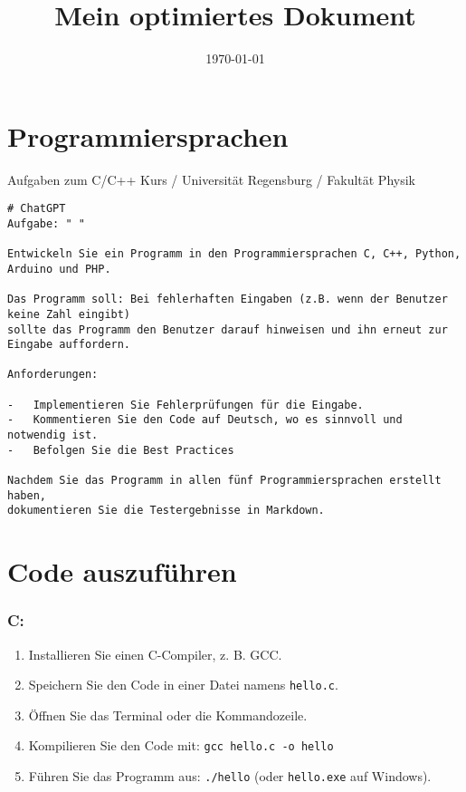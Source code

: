 \documentclass[12pt,a4paper]{scrartcl}
\title{Mein optimiertes Dokument}
\date{\today}
\newcommand{\tightlist}{
  \setlength{\itemsep}{0pt}\setlength{\parskip}{0pt}
}
\begin{document}
\maketitle

\hypertarget{programmiersprachen}{%
\section{Programmiersprachen}\label{programmiersprachen}}

Aufgaben zum C/C++ Kurs / Universität Regensburg / Fakultät Physik

\begin{lstlisting}
# ChatGPT
Aufgabe: " "

Entwickeln Sie ein Programm in den Programmiersprachen C, C++, Python, Arduino und PHP. 

Das Programm soll: Bei fehlerhaften Eingaben (z.B. wenn der Benutzer keine Zahl eingibt) 
sollte das Programm den Benutzer darauf hinweisen und ihn erneut zur Eingabe auffordern.

Anforderungen:

-   Implementieren Sie Fehlerprüfungen für die Eingabe.
-   Kommentieren Sie den Code auf Deutsch, wo es sinnvoll und notwendig ist.
-   Befolgen Sie die Best Practices

Nachdem Sie das Programm in allen fünf Programmiersprachen erstellt haben, 
dokumentieren Sie die Testergebnisse in Markdown.
\end{lstlisting}

\hypertarget{code-auszufuxfchren}{%
\section{Code auszuführen}\label{code-auszufuxfchren}}

\hypertarget{c}{%
\subsubsection{C:}\label{c}}

\begin{enumerate}
\def\labelenumi{\arabic{enumi}.}
\tightlist
\item
  Installieren Sie einen C-Compiler, z. B. GCC.
\item
  Speichern Sie den Code in einer Datei namens
  {\lstinline!hello.c!}.
\item
  Öffnen Sie das Terminal oder die Kommandozeile.
\item
  Kompilieren Sie den Code mit:
  {\lstinline!gcc hello.c -o hello!}
\item
  Führen Sie das Programm aus: {\lstinline!./hello!} (oder
  {\lstinline!hello.exe!} auf Windows).
\end{enumerate}
\end{document}
